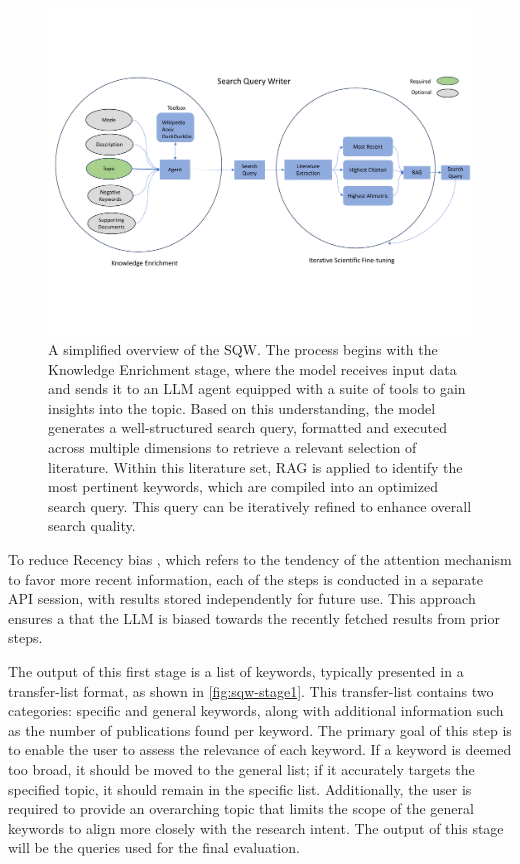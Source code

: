 \begin{figure}[!h]
	\centering
	\includegraphics[scale=.48]{pics/sqw-overview.pdf}
	\caption[Search Query Writer]{A simplified overview of the SQW. The process begins with the Knowledge Enrichment stage, where the model receives input data and sends it to an LLM agent equipped with a suite of tools to gain insights into the topic. Based on this understanding, the model generates a well-structured search query, formatted and executed across multiple dimensions to retrieve a relevant selection of literature. Within this literature set, RAG is applied to identify the most pertinent keywords, which are compiled into an optimized search query. This query can be iteratively refined to enhance overall search quality.}
	\label{fig:sqw-overview}
\end{figure}

To reduce Recency bias \autocite{Deldjoo2024}, which refers to the tendency of the attention mechanism to favor more recent information, each of the steps is conducted in a separate API session, with results stored independently for future use. This approach ensures a that the LLM is biased towards the recently fetched results from prior steps.

The output of this first stage is a list of keywords, typically presented in a transfer-list format, as shown in \autoref{fig:sqw-stage1}. This transfer-list contains two categories: specific and general keywords, along with additional information such as the number of publications found per keyword. The primary goal of this step is to enable the user to assess the relevance of each keyword. If a keyword is deemed too broad, it should be moved to the general list; if it accurately targets the specified topic, it should remain in the specific list. Additionally, the user is required to provide an overarching topic that limits the scope of the general keywords to align more closely with the research intent. The output of this stage will be the queries used for the final evaluation.

